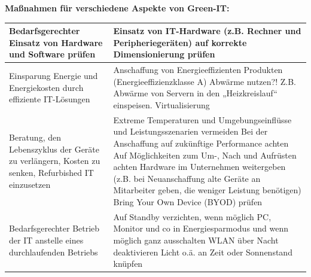 \documentclass[10pt]{article}
\begin{document}
\begin{flushleft}
\begin{table}[H]
\begin{tabular}{|p{}|p{}|}
    \end{tabular}
\end{table}

\break

\textbf{Maßnahmen für verschiedene Aspekte von Green-IT:}
\begin{table}[H]
    \centering
    \begin{tabular}{|p{}|p{}|}

        \hline
    
        Bedarfsgerechter Einsatz von Hardware und Software prüfen & Einsatz von IT-Hardware (z.B. Rechner und Peripheriegeräten) auf korrekte Dimensionierung prüfen

        \\\hline

        Einsparung Energie und Energiekosten durch effiziente IT-Lösungen & Anschaffung von Energieeffizienten Produkten (Energieeffizienzklasse A)
        \newline Abwärme nutzen?! Z.B. Abwärme von Servern in den „Heizkreislauf“ einspeisen.
        \newline Virtualisierung

        \\\hline

        Beratung, den Lebenszyklus der Geräte zu verlängern, Kosten zu senken, Refurbished IT einzusetzen & Extreme Temperaturen und Umgebungseinflüsse und Leistungsszenarien vermeiden
        \newline Bei der Anschaffung auf zukünftige Performance achten
        \newline Auf Möglichkeiten zum Um-, Nach und Aufrüsten achten
        \newline Hardware im Unternehmen weitergeben (z.B. bei Neuanschaffung alte Geräte an Mitarbeiter geben, die weniger Leistung benötigen)
        \newline Bring Your Own Device (BYOD) prüfen

        \\\hline

        Bedarfsgerechter Betrieb der IT anstelle eines durchlaufenden Betriebs & Auf Standby verzichten, wenn möglich
        \newline PC, Monitor und co in Energiesparmodus und wenn möglich ganz ausschalten
        \newline WLAN über Nacht deaktivieren
        \newline Licht o.ä. an Zeit oder Sonnenstand knüpfen


\end{tabular}
\end{table}
\end{flushleft}
\end{document}
